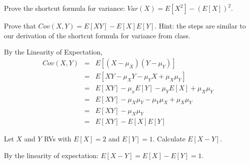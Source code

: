 \documentclass[addpoints,12pt]{exam}
\begin{document}
\begin{questions}



\question Prove the shortcut formula for variance: $Var(X) = E[X^2] - \left( E[X] \right)^2$.

\question Prove that $Cov(X,Y) = E[XY] - E[X]E[Y]$. Hint: the steps are similar to our derivation of the shortcut formula for variance from class.
	\begin{solution}
	By the Linearity of Expectation,
	\begin{eqnarray*}
	Cov(X,Y)&=& E[(X - \mu_X)(Y-\mu_Y)]\\
			&=& E[XY - \mu_X Y - \mu_Y X + \mu_X \mu_Y]\\
			&=&E[XY] - \mu_xE[Y] - \mu_Y E[X] + \mu_X \mu_Y\\
			&=& E[XY] - \mu_X\mu_Y - \mu_Y\mu_X + \mu_X \mu_Y\\
			&=& E[XY] - \mu_X \mu_Y\\
			&=& E[XY] - E[X]E[Y]
\end{eqnarray*}
\end{solution}

\question Let $X$ and $Y$ RVs with $E[X] = 2$ and $E[Y] = 1$. Calculate $E[X - Y]$.
\begin{solution}
  By the linearity of expectation: $E[X - Y] = E[X] - E[Y] = 1$. 
\end{solution}


\end{questions}
\end{document}
